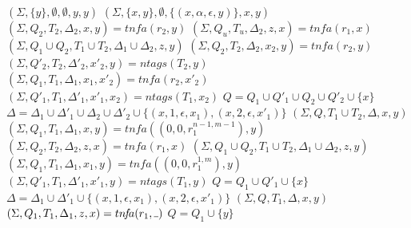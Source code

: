 \documentclass[AMA,STIX1COL]{WileyNJD-v2}
\newcommand{\Xund}{\rule{.4em}{.4pt}}
\begin{document}
\begin{algorithm}[] \DontPrintSemicolon {}
\begin{multicols}{2}

    \newcommand \retonfa {tn\!f\!a}
    \newcommand \ntag {ntags}

    \Fn {$\underline{\retonfa(r, y)} \smallskip$} {
         {
            \Return $(\Sigma, \{y\}, \emptyset, \emptyset, y, y)$
        }
        \BlankLine
         {
            \Return $(\Sigma, \{x,y\}, \emptyset, \{(x, \alpha, \epsilon, y)\}, x, y)$
        }
        \BlankLine
         {
            $(\Sigma, Q_2, T_2, \Delta_2, x, y) = \retonfa (r_2, y)$ \;
            $(\Sigma, Q_u, T_u, \Delta_2, z, x) = \retonfa (r_1, x)$ \;
            \Return $(\Sigma, Q_1 \cup Q_2, T_1 \cup T_2, \Delta_1 \cup \Delta_2, z, y)$
        }
        \BlankLine
         {
            $(\Sigma, Q_2, T_2, \Delta_2, x_2, y) = \retonfa (r_2, y)$ \;
            $(\Sigma, Q'_2, T_2, \Delta'_2, x'_2, y) = \ntag (T_2, y)$ \;
            $(\Sigma, Q_1, T_1, \Delta_1, x_1, x'_2) = \retonfa (r_2, x'_2)$ \;
            $(\Sigma, Q'_1, T_1, \Delta'_1, x'_1, x_2) = \ntag (T_1, x_2)$ \;
            $Q = Q_1 \cup Q'_1 \cup Q_2 \cup Q'_2 \cup \{x\}$ \;
            $\Delta = \Delta_1 \cup \Delta'_1 \cup \Delta_2 \cup \Delta'_2 \cup \big\{ (x,1,\epsilon,x_1), (x,2,\epsilon,x'_1) \big\}$ \;
            \Return $(\Sigma, Q, T_1 \cup T_2, \Delta, x, y)$
        }
        \BlankLine
         {
            $(\Sigma, Q_1, T_1, \Delta_1, x, y) = \retonfa ((0, 0, r_1^{n-1,m-1}), y)$ \;
            $(\Sigma, Q_2, T_2, \Delta_2, z, x) = \retonfa (r_1, x)$ \;
            \Return $(\Sigma, Q_1 \cup Q_2, T_1 \cup T_2, \Delta_1 \cup \Delta_2, z, y)$
        }
        \BlankLine
         {
            $(\Sigma, Q_1, T_1, \Delta_1, x_1, y) = \retonfa ((0, 0, r_1^{1,m}), y)$ \;
            $(\Sigma, Q'_1, T_1, \Delta'_1, x'_1, y) = \ntag (T_1, y)$ \;
            $Q = Q_1 \cup Q'_1 \cup \{x\}$ \;
            $\Delta = \Delta_1 \cup \Delta'_1 \cup \big\{ (x, 1, \epsilon, x_1), (x, 2, \epsilon, x'_1) \big\}$ \;
            \Return $(\Sigma, Q, T_1, \Delta, x, y)$
        }
        \BlankLine
         {
            $(\Sigma, Q_1, T_1, \Delta_1, z, x) = \retonfa (r_1, \Xund)$ \;
            $Q = Q_1 \cup \{y\}$ \;
}}
\end{multicols}
\end{algorithm}
\end{document}
